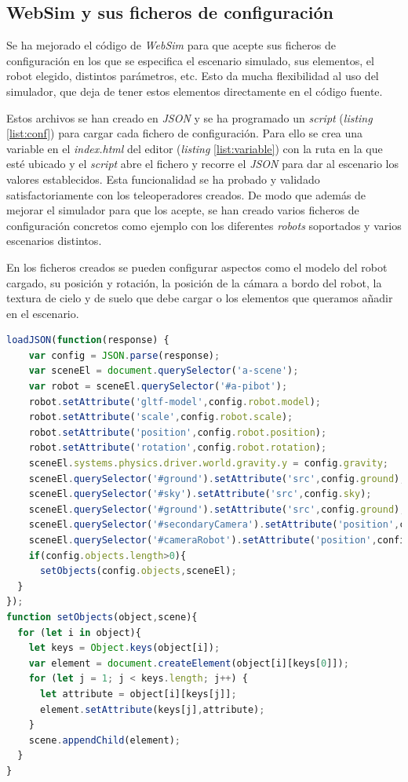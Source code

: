 \subsection{WebSim y sus ficheros de configuración}

Se ha mejorado el código de \textit{WebSim} para que acepte sus ficheros de configuración en los que se especifica el escenario simulado, sus elementos, el robot elegido, distintos parámetros, etc. Esto da mucha flexibilidad al uso del simulador, que deja de tener estos elementos directamente en el código fuente. 

Estos archivos se han creado en \textit{JSON} y se ha programado un \textit{script} (\textit{listing} \ref{list:conf}) para cargar cada fichero de configuración. Para ello se crea una variable en el \textit{index.html} del editor (\textit{listing} \ref{list:variable}) con la ruta en la que esté ubicado y el \textit{script} abre el fichero y recorre el \textit{JSON} para dar al escenario los valores establecidos.
Esta funcionalidad se ha probado y validado satisfactoriamente con los teleoperadores creados. De modo que además de mejorar el simulador para que los acepte, se han creado varios ficheros de configuración concretos como ejemplo con los diferentes \textit{robots} soportados y varios escenarios distintos. 

En los ficheros creados se pueden configurar aspectos como el modelo del robot cargado, su posición y rotación, la posición de la cámara a bordo del robot, la textura de cielo y de suelo que debe cargar o los elementos que queramos añadir en el escenario. 
\begin{lstlisting}[language=JavaScript,caption=\textit{script} que carga los ficheros de configuración,label={list:conf}]
  loadJSON(function(response) {
    var config = JSON.parse(response);
    var sceneEl = document.querySelector('a-scene');
    var robot = sceneEl.querySelector('#a-pibot');
    robot.setAttribute('gltf-model',config.robot.model);
    robot.setAttribute('scale',config.robot.scale);
    robot.setAttribute('position',config.robot.position);
    robot.setAttribute('rotation',config.robot.rotation);
    sceneEl.systems.physics.driver.world.gravity.y = config.gravity;
    sceneEl.querySelector('#ground').setAttribute('src',config.ground);
    sceneEl.querySelector('#sky').setAttribute('src',config.sky);
    sceneEl.querySelector('#ground').setAttribute('src',config.ground);
    sceneEl.querySelector('#secondaryCamera').setAttribute('position',config.secondaryCamera);
    sceneEl.querySelector('#cameraRobot').setAttribute('position',config.cameraRobot);
    if(config.objects.length>0){
      setObjects(config.objects,sceneEl);
  }
});
function setObjects(object,scene){
  for (let i in object){
    let keys = Object.keys(object[i]);
    var element = document.createElement(object[i][keys[0]]);
    for (let j = 1; j < keys.length; j++) {
      let attribute = object[i][keys[j]];
      element.setAttribute(keys[j],attribute);
    }
    scene.appendChild(element);
  }
}
\end{lstlisting}

